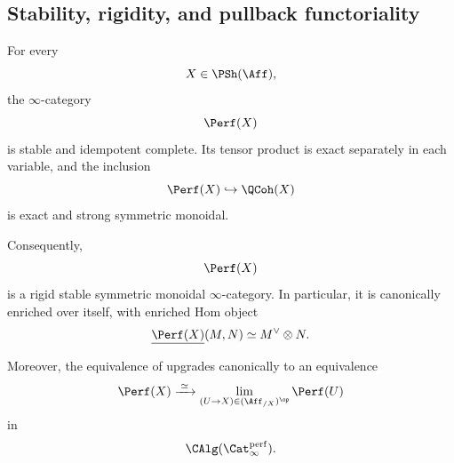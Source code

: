 \subsection{Stability, rigidity, and pullback functoriality}

\begin{proposition}
\label{prop:perfect-stable-monoidal}
For every
\[
    X\in\PSh(\Aff),
\]
the $\infty$-category
\[
    \Perf(X)
\]
is stable and idempotent complete. Its tensor product is exact separately
in each variable, and the inclusion
\[
    \Perf(X)
    \hookrightarrow
    \QCoh(X)
\]
is exact and strong symmetric monoidal.

Consequently,
\[
    \Perf(X)
\]
is a rigid stable symmetric monoidal $\infty$-category. In particular, it
is canonically enriched over itself, with enriched Hom object
\[
    \underline{\Perf(X)}(M,N)
    \simeq
    M^\vee\otimes N.
\]

Moreover, the equivalence of
upgrades canonically to an equivalence
\[
    \Perf(X)
    \xrightarrow{\;\simeq\;}
    \lim_{
        (U\to X)\in(\Aff_{/X})^{\op}
    }
    \Perf(U)
\]
in
\[
    \CAlg(\Cat_\infty^{\mathrm{perf}}).
\]
\end{proposition}

